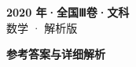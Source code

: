 \documentclass[zihao=-4, a4paper]{ctexart}
\begin{document}
\begin{center}
  {\Large\bfseries 2020 年·全国Ⅲ卷·文科}\\[4pt]
  {\large 数学 · 解析版}
\end{center}
\medskip
{}

\clearpage
{}
\begin{center}{\Large\bfseries 参考答案与详细解析}\end{center}
\medskip

\end{document}
